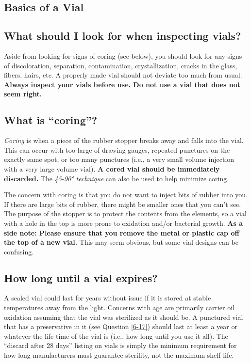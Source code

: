 \documentclass{article}
\begin{document}
\subsection*{Basics of a Vial}

\subsection{What should I look for when inspecting vials?}

Aside from looking for signs of coring (see below), you should look for any signs of discoloration, separation, contamination, crystallization, cracks in the glass, fibers, hairs, etc. A properly made vial should not deviate too much from usual. \textbf{Always inspect your vials before use. Do not use a vial that does not seem right.}

\subsection{What is “coring”?}\label{5-23}

\textit{Coring} is when a piece of the rubber stopper breaks away and falls into the vial. This can occur with too large of drawing gauges, repeated punctures on the exactly same spot, or too many punctures (i.e., a very small volume injection with a very large volume vial). \textbf{A cored vial should be immediately discarded.} The \href{https://www.youtube.com/watch?v=w5F0SLoMjC8}{\textit{45-90° technique}} can also be used to help minimize coring.

The concern with coring is that you do not want to inject bits of rubber into you. If there are large bits of rubber, there might be smaller ones that you can't see. The purpose of the stopper is to protect the contents from the elements, so a vial with a hole in the top is more prone to oxidation and/or bacterial growth. \textbf{As a side note: Please ensure that you remove the metal or plastic cap off the top of a new vial.} This may seem obvious, but some vial designs can be confusing.

\subsection{How long until a vial expires?}

A sealed vial could last for years without issue if it is stored at stable temperatures away from the light. Concerns with age are primarily carrier oil oxidation assuming that the vial was sterilized as it should be. A punctured vial that has a preservative in it (see Question \ref{6-17}) should last at least a year or whatever the life time of the vial is (i.e., how long until you use it all). The “discard after 28 days” listing on vials is simply the minimum requirement for how long manufacturers must guarantee sterility, not the maximum shelf life.
\end{document}
